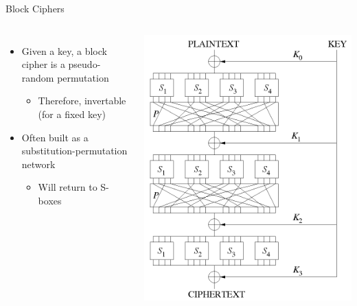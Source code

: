 \documentclass[ignorenonframetext,]{beamer}
\providecommand{\tightlist}{%
  \setlength{\itemsep}{0pt}\setlength{\parskip}{0pt}}
\newcommand{\columnsbegin}{\begin{columns}}
\newcommand{\columnsend}{\end{columns}}
\begin{document}
\begin{frame}{Block Ciphers}

\columnsbegin


\begin{itemize}
\tightlist
\item
  Given a key, a block cipher is a pseudo-random permutation

  \begin{itemize}
  \tightlist
  \item
    Therefore, invertable (for a fixed key)
  \end{itemize}
\item
  Often built as a substitution-permutation network

  \begin{itemize}
  \tightlist
  \item
    Will return to S-boxes
  \end{itemize}
\end{itemize}


\includegraphics[width=\textwidth]{images/spn2.png}

\columnsend

\end{frame}
\end{document}
